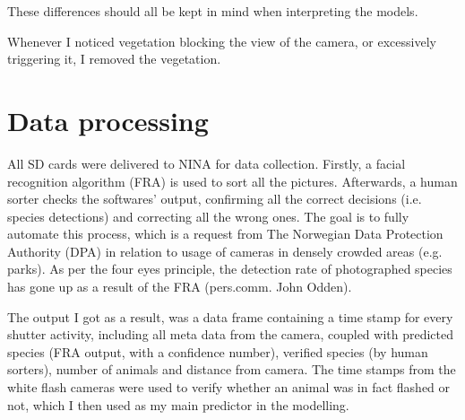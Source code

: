 These differences should all be kept in mind when interpreting the models. 




Whenever I noticed vegetation blocking the view of the camera, or excessively triggering it, I removed the vegetation.

\begin{figure}
	\label{fig:map}
\end{figure}




\section{Data processing} %
All SD cards were delivered to NINA for data collection. Firstly, a facial recognition algorithm (FRA)  is used to sort all the pictures. %
Afterwards, a human sorter checks the softwares' output, confirming all the correct decisions (i.e. species detections) and correcting all the wrong ones.
The goal is to fully automate this process, which is a request from The Norwegian Data Protection Authority (DPA) in relation to usage of cameras in densely crowded areas (e.g. parks).
As per the four eyes principle, the detection rate of photographed species has gone up as a result of the FRA (pers.comm. John Odden). 



The output I got as a result, was a data frame containing a time stamp for every shutter activity, %
including all meta data from the camera, coupled with predicted species (FRA output, with a confidence number), verified species (by human sorters), number of animals and distance from camera. The time stamps from the white flash cameras were used to verify whether an animal was in fact flashed or not, which I then used as my main predictor in the modelling. 


